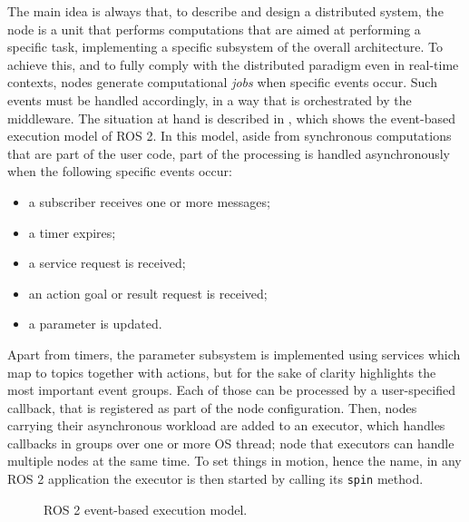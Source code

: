 The main idea is always that, to describe and design a distributed system, the node is a unit that performs computations that are aimed at performing a specific task, implementing a specific subsystem of the overall architecture. To achieve this, and to fully comply with the distributed paradigm even in real-time contexts, nodes generate computational \emph{jobs} when specific events occur. Such events must be handled accordingly, in a way that is orchestrated by the middleware. The situation at hand is described in , which shows the event-based execution model of ROS 2. In this model, aside from synchronous computations that are part of the user code, part of the processing is handled asynchronously when the following specific events occur:
\begin{itemize}
  \item a subscriber receives one or more messages;
  \item a timer expires;
  \item a service request is received;
  \item an action goal or result request is received;
  \item a parameter is updated.
\end{itemize}
Apart from timers, the parameter subsystem is implemented using services which map to topics together with actions, but for the sake of clarity  highlights the most important event groups. Each of those can be processed by a user-specified callback, that is registered as part of the node configuration. Then, nodes carrying their asynchronous workload are added to an executor, which handles callbacks in groups over one or more OS thread; node that executors can handle multiple nodes at the same time. To set things in motion, hence the name, in any ROS 2 application the executor is then started by calling its \texttt{spin} method.
\begin{figure}[t!]
  \centering
  
  \caption{ROS 2 event-based execution model.}
  \label{fig:ros2exec}
\end{figure}

